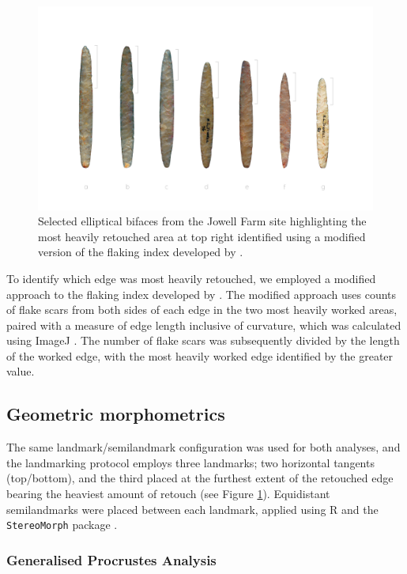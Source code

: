\documentclass[]{interact}
\theoremstyle{plain}%
\theoremstyle{definition}
\theoremstyle{remark}
\begin{document}
\begin{figure}\centering
\includegraphics[width=\linewidth]{figs/ellipticalbifaces.png}
\caption{Selected elliptical bifaces from the Jowell Farm site highlighting the most heavily retouched area at top right identified using a modified version of the flaking index developed by \citet{RN11099}.}
\label{fig:elliptical}
\end{figure}

To identify which edge was most heavily retouched, we employed a
modified approach to the flaking index developed by \citet{RN11099}. The
modified approach uses counts of flake scars from both sides of each
edge in the two most heavily worked areas, paired with a measure of edge
length inclusive of curvature, which was calculated using ImageJ
\citep{RN11146,RN11147,RN11148}. The number of flake scars was
subsequently divided by the length of the worked edge, with the most
heavily worked edge identified by the greater value.

\hypertarget{geometric-morphometrics}{%
\subsection{Geometric morphometrics}\label{geometric-morphometrics}}

The same landmark/semilandmark configuration was used for both analyses,
and the landmarking protocol employs three landmarks; two horizontal
tangents (top/bottom), and the third placed at the furthest extent of
the retouched edge bearing the heaviest amount of retouch (see Figure
\ref{fig:elliptical}). Equidistant semilandmarks were placed between
each landmark, applied using R \citep{R} and the \texttt{StereoMorph}
package \citep{RN9091}.

\hypertarget{generalised-procrustes-analysis}{%
\subsubsection{Generalised Procrustes
Analysis}\label{generalised-procrustes-analysis}}
\end{document}
